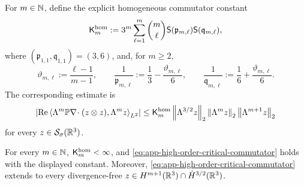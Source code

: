 For \(m\in\mathbb N\), define the explicit homogeneous commutator constant
\begin{equation}
 \mathsf K_m^{\rm hom}:=
 3^m\sum_{\ell=1}^m\binom m\ell
 \mathsf S(\mathfrak p_{m,\ell})\mathsf S(\mathfrak q_{m,\ell}),
 \label{eq:app-explicit-homogeneous-commutator-constant}
\end{equation}
where \((\mathfrak p_{1,1},\mathfrak q_{1,1})=(3,6)\), and, for \(m\ge2\),
\[
 \vartheta_{m,\ell}:=\frac{\ell-1}{m-1},
 \qquad
 \frac1{\mathfrak p_{m,\ell}}:=\frac13-\frac{\vartheta_{m,\ell}}6,
 \qquad
 \frac1{\mathfrak q_{m,\ell}}:=\frac16+\frac{\vartheta_{m,\ell}}6.
\]
The corresponding estimate is
\begin{equation}
 \left|\operatorname{Re}
 \left\langle \Lambda^m\mathbb P\nabla\!\cdot(z\otimes z),\Lambda^mz\right\rangle_{L^2}\right|
 \le
 \mathsf K_m^{\rm hom}
 \left\lVert \Lambda^{3/2}z\right\rVert_2
 \left\lVert \Lambda^mz\right\rVert_2
 \left\lVert \Lambda^{m+1}z\right\rVert_2
 \label{eq:app-high-order-critical-commutator}
\end{equation}
for every \(z\in\mathcal S_\sigma(\mathbb R^3)\).

\begin{lemma}
\label{lem:app-critical-commutator}
For every \(m\in\mathbb N\), \(\mathsf K_m^{\rm hom}<\infty\), and
\eqref{eq:app-high-order-critical-commutator} holds with the displayed
constant.
Moreover, \eqref{eq:app-high-order-critical-commutator} extends to every
divergence-free
\(z\in H^{m+1}(\mathbb R^3)\cap\dot H^{3/2}(\mathbb R^3)\).
\end{lemma}

